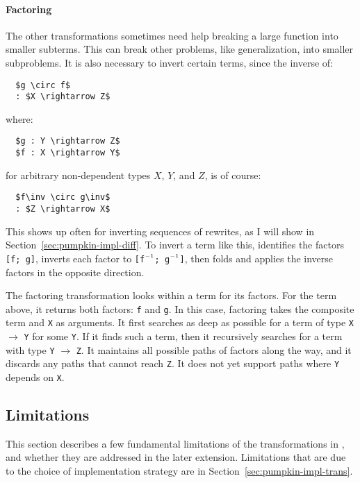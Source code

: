 \paragraph{Factoring} The other transformations sometimes need help breaking a large function into smaller subterms.
This can break other problems, like generalization, into smaller subproblems.
It is also necessary to invert certain terms, since the inverse of:

\begin{lstlisting}
  $g \circ f$
  : $X \rightarrow Z$
\end{lstlisting}
where:

\begin{lstlisting}
  $g : Y \rightarrow Z$
  $f : X \rightarrow Y$
\end{lstlisting}
for arbitrary non-dependent types $X$, $Y$, and $Z$,
is of course:

\begin{lstlisting}
  $f\inv \circ g\inv$
  : $Z \rightarrow X$ 
\end{lstlisting}
This shows up often for inverting sequences of rewrites, as I will show in Section~\ref{sec:pumpkin-impl-diff}.
To invert a term like this, \sysname identifies the factors \lstinline{[f; g]}, 
inverts each factor to \lstinline{[f}$\inv$\lstinline{; g}$\inv$\lstinline{]}, 
then folds and applies the inverse factors in the opposite direction.

The factoring transformation looks within a term for its factors.
For the term above, it returns both factors: \lstinline{f} and \lstinline{g}.
In this case, factoring takes the composite term and \lstinline{X} as arguments.
It first searches as deep as possible for a term of type \lstinline{X} $\rightarrow$ \lstinline{Y} for some \lstinline{Y}.
If it finds such a term, then it recursively searches for a term with type \lstinline{Y} $\rightarrow$ \lstinline{Z}. 
It maintains all possible 
paths of factors along the way, and it discards any paths that cannot reach \lstinline{Z}.
It does not yet support paths where \lstinline{Y} depends on \lstinline{X}.

\subsection{Limitations}
\label{sec:pumpkin-trans-limitations}

This section describes a few fundamental limitations of the transformations in \sysname,
and whether they are addressed in the later \toolnamec extension.
Limitations that are due to the choice of implementation strategy are in Section~\ref{sec:pumpkin-impl-trans}.

